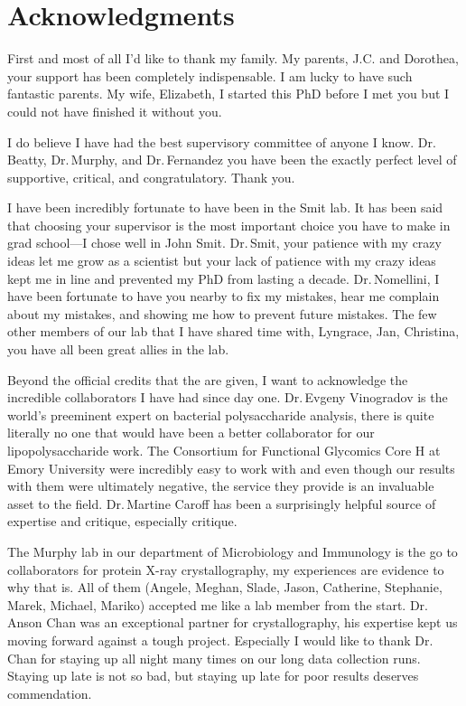 
\chapter{Acknowledgments}

First and most of all I'd like to thank my family. My parents, J.C. and Dorothea, your support has been completely indispensable. I am lucky to have such fantastic parents. My wife, Elizabeth, I started this PhD before I met you but I could not have finished it without you. 

I do believe I have had the best supervisory committee of anyone I know. Dr.\,Beatty, Dr.\,Murphy, and  Dr.\,Fernandez you have been the exactly perfect level of supportive, critical, and congratulatory. Thank you.

I have been incredibly fortunate to have been in the Smit lab. It has been said that choosing your supervisor is the most important choice you have to make in grad school---I chose well in John Smit. Dr.\,Smit, your patience with my crazy ideas let me grow as a scientist but your lack of patience with my crazy ideas kept me in line and prevented my PhD from lasting a decade. Dr.\,Nomellini, I have been fortunate to have you nearby to fix my mistakes, hear me complain about my mistakes, and showing me how to prevent future mistakes. The few other members of our lab that I have shared time with, Lyngrace, Jan, Christina, you have all been great allies in the lab.

Beyond the official credits that the are given, I want to acknowledge the incredible collaborators I have had since day one. 
Dr.\,Evgeny Vinogradov is the world's preeminent expert on bacterial polysaccharide analysis, there is quite literally no one that would have been a better collaborator for our lipopolysaccharide work. The Consortium for Functional Glycomics Core H at Emory University were incredibly easy to work with and even though our results with them were ultimately negative, the service they provide is an invaluable asset to the field. Dr.\,Martine Caroff has been a surprisingly helpful source of expertise and critique, especially critique.

The Murphy lab in our department of Microbiology and Immunology is the go to collaborators for protein X-ray crystallography, my experiences are evidence to why that is. All of them (Angele, Meghan, Slade, Jason, Catherine, Stephanie, Marek, Michael, Mariko) accepted me like a lab member from the start. Dr.\,Anson Chan was an exceptional partner for crystallography, his expertise kept us moving forward against a tough project. Especially I would like to thank Dr.\,Chan for staying up all night many times on our long data collection runs. Staying up late is not so bad, but staying up late for poor results deserves commendation. 


